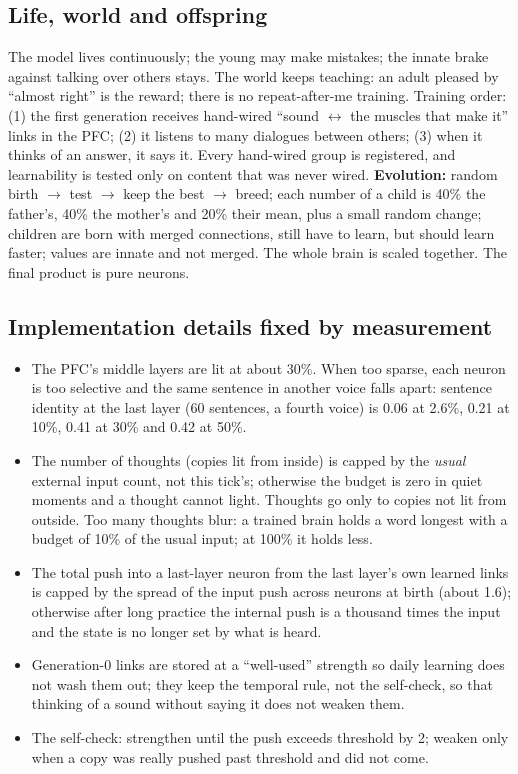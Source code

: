 \documentclass[11pt]{article}
\begin{document}
\subsection{Life, world and offspring}
The model lives continuously; the young may make mistakes; the innate brake against talking over others stays. The world
keeps teaching: an adult pleased by ``almost right'' is the reward; there is no repeat-after-me training. Training order:
(1) the first generation receives hand-wired ``sound $\leftrightarrow$ the muscles that make it'' links in the PFC; (2) it
listens to many dialogues between others; (3) when it thinks of an answer, it says it. Every hand-wired group is
registered, and learnability is tested only on content that was never wired. \textbf{Evolution:} random birth $\to$ test
$\to$ keep the best $\to$ breed; each number of a child is 40\% the father's, 40\% the mother's and 20\% their mean, plus
a small random change; children are born with merged connections, still have to learn, but should learn faster; values
are innate and not merged. The whole brain is scaled together. The final product is pure neurons.

\subsection{Implementation details fixed by measurement}\label{sec:core}
\begin{itemize}
\item The PFC's middle layers are lit at about 30\%. When too sparse, each neuron is too selective and the same sentence
in another voice falls apart: sentence identity at the last layer (60 sentences, a fourth voice) is 0.06 at 2.6\%, 0.21
at 10\%, 0.41 at 30\% and 0.42 at 50\%.
\item The number of thoughts (copies lit from inside) is capped by the \emph{usual} external input count, not this tick's;
otherwise the budget is zero in quiet moments and a thought cannot light. Thoughts go only to copies not lit from outside.
Too many thoughts blur: a trained brain holds a word longest with a budget of 10\% of the usual input; at 100\% it holds
less.
\item The total push into a last-layer neuron from the last layer's own learned links is capped by the spread of the
input push across neurons at birth (about 1.6); otherwise after long practice the internal push is a thousand times the
input and the state is no longer set by what is heard.
\item Generation-0 links are stored at a ``well-used'' strength so daily learning does not wash them out; they keep the
temporal rule, not the self-check, so that thinking of a sound without saying it does not weaken them.
\item The self-check: strengthen until the push exceeds threshold by 2; weaken only when a copy was really pushed past
threshold and did not come.
\end{itemize}
\end{document}
